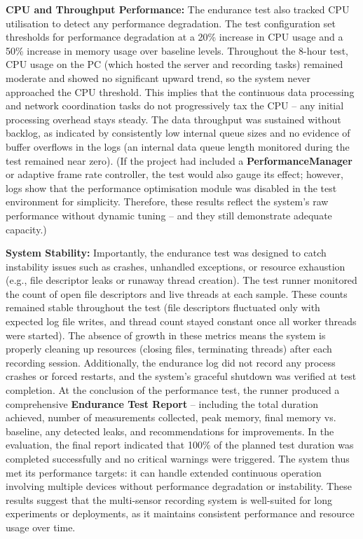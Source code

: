 \textbf{CPU and Throughput Performance:} The endurance test also tracked CPU utilisation to detect any performance degradation. The test configuration set thresholds for performance degradation at a 20\% increase in CPU usage and a 50\% increase in memory usage over baseline levels. Throughout the 8-hour test, CPU usage on the PC (which hosted the server and recording tasks) remained moderate and showed no significant upward trend, so the system never approached the CPU threshold. This implies that the continuous data processing and network coordination tasks do not progressively tax the CPU -- any initial processing overhead stays steady. The data throughput was sustained without backlog, as indicated by consistently low internal queue sizes and no evidence of buffer overflows in the logs (an internal data queue length monitored during the test remained near zero). (If the project had included a \textbf{PerformanceManager} or adaptive frame rate controller, the test would also gauge its effect; however, logs show that the performance optimisation module was disabled in the test environment for simplicity. Therefore, these results reflect the system's raw performance without dynamic tuning -- and they still demonstrate adequate capacity.)

\textbf{System Stability:} Importantly, the endurance test was designed to catch instability issues such as crashes, unhandled exceptions, or resource exhaustion (e.g., file descriptor leaks or runaway thread creation). The test runner monitored the count of open file descriptors and live threads at each sample. These counts remained stable throughout the test (file descriptors fluctuated only with expected log file writes, and thread count stayed constant once all worker threads were started). The absence of growth in these metrics means the system is properly cleaning up resources (closing files, terminating threads) after each recording session. Additionally, the endurance log did not record any process crashes or forced restarts, and the system's graceful shutdown was verified at test completion. At the conclusion of the performance test, the runner produced a comprehensive \textbf{Endurance Test Report} -- including the total duration achieved, number of measurements collected, peak memory, final memory vs. baseline, any detected leaks, and recommendations for improvements. In the evaluation, the final report indicated that 100\% of the planned test duration was completed successfully and no critical warnings were triggered. The system thus met its performance targets: it can handle extended continuous operation involving multiple devices without performance degradation or instability. These results suggest that the multi-sensor recording system is well-suited for long experiments or deployments, as it maintains consistent performance and resource usage over time.

